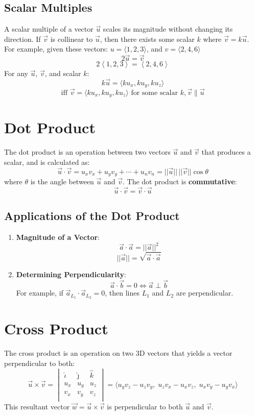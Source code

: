 \documentclass[a4paper,12pt,openany]{book}
\newcommand{\vcomponents}[4]{
    #1 = \langle #2, #3, #4 \rangle
}
\newcommand{\uniti}{
    \hat{\iota}
}
\newcommand{\unitj}{
    \hat{\jmath}
}
\newcommand{\unitk}{
    \hat{k}
}
\begin{document}
\subsection{Scalar Multiples}
A scalar multiple of a vector \(\vec{u}\) scales its magnitude without changing its direction. If \(\vec{v}\) is collinear to \(\vec{u}\), then there exists some scalar $k$ where \(\vec{v} = k\vec{u}\).
For example, given these vectors: $\vcomponents{u}{1}{2}{3}$, and $\vcomponents{v}{2}{4}{6}$
\[
2\vec{u} = \vec{v}
\]
\[
2\left\langle 1, 2, 3\right\rangle = 
\left\langle 2, 4, 6\right\rangle
\]
For any \(\vec{u}\), \(\vec{v}\), and scalar \(k\):
\[
k\vec{u} = \langle ku_x, ku_y, ku_z \rangle
\]
\[
    \text{iff } \vec{v} = \langle ku_x, ku_y, ku_z \rangle \text{ for some scalar } k, \vec{v} \parallel \vec{u}
\]


\section{Dot Product}
The dot product is an operation between two vectors \(\vec{u}\) and \(\vec{v}\) that produces a scalar, and is calculated as:
\[
    \vec{u} \cdot \vec{v} = u_x v_x + u_y v_y + \cdots + u_n v_n = ||\vec{u}|| \, ||\vec{v}|| \cos{\theta}
\]
where \(\theta\) is the angle between \(\vec{u}\) and \(\vec{v}\). The dot product is \textbf{commutative}:
\[
    \vec{u} \cdot \vec{v} = \vec{v} \cdot \vec{u}
\] 

\subsection{Applications of the Dot Product}
\begin{enumerate}
    \item \textbf{Magnitude of a Vector}:
    \[
        \vec{a} \cdot \vec{a} = ||\vec{a}||^2
    \]
    \[
        ||\vec{a}|| = \sqrt{\vec{a} \cdot \vec{a}}
    \]

    \item \textbf{Determining Perpendicularity}:
    \[
        \vec{a} \cdot \vec{b} = 0 \iff \vec{a} \perp \vec{b}
    \]
    For example, if \(\vec{a}_{L_1} \cdot \vec{a}_{L_2} = 0\), then lines \(L_1\) and \(L_2\) are perpendicular.
\end{enumerate}

\section{Cross Product}
The cross product is an operation on two 3D vectors that yields a vector perpendicular to both:
\[
    \vec{u} \times \vec{v} = 
    \begin{vmatrix}
        \uniti & \unitj & \unitk \\
        u_x & u_y & u_z \\
        v_x & v_y & v_z \\
    \end{vmatrix} 
    = \langle u_y v_z - u_z v_y, \; u_z v_x - u_x v_z, \; u_x v_y - u_y v_x \rangle
\]
This resultant vector \(\vec{w} = \vec{u} \times \vec{v}\) is perpendicular to both \(\vec{u}\) and \(\vec{v}\).
\end{document}
